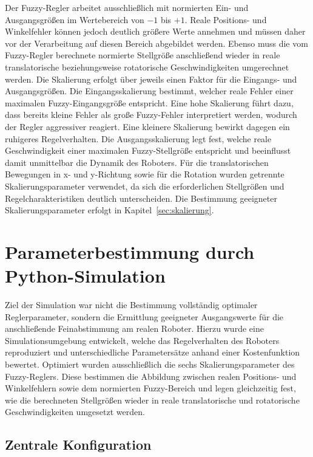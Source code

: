Der Fuzzy-Regler arbeitet ausschließlich mit normierten Ein- und Ausgangsgrößen im Wertebereich von $-1$ bis $+1$. Reale Positions- und Winkelfehler können jedoch deutlich größere Werte annehmen und müssen daher vor der Verarbeitung auf diesen Bereich abgebildet werden. Ebenso muss die vom Fuzzy-Regler berechnete normierte Stellgröße anschließend wieder in reale translatorische beziehungsweise rotatorische Geschwindigkeiten umgerechnet werden. Die Skalierung erfolgt über jeweils einen Faktor für die Eingangs- und Ausgangsgrößen. Die Eingangsskalierung bestimmt, welcher reale Fehler einer maximalen Fuzzy-Eingangsgröße entspricht. Eine hohe Skalierung führt dazu, dass bereits kleine Fehler als große Fuzzy-Fehler interpretiert werden, wodurch der Regler aggressiver reagiert. Eine kleinere Skalierung bewirkt dagegen ein ruhigeres Regelverhalten. Die Ausgangsskalierung legt fest, welche reale Geschwindigkeit einer maximalen Fuzzy-Stellgröße entspricht und beeinflusst damit unmittelbar die Dynamik des Roboters. Für die translatorischen Bewegungen in x- und y-Richtung sowie für die Rotation wurden getrennte Skalierungsparameter verwendet, da sich die erforderlichen Stellgrößen und Regelcharakteristiken deutlich unterscheiden. Die Bestimmung geeigneter Skalierungsparameter erfolgt in Kapitel~\ref{sec:skalierung}.

\section{Parameterbestimmung durch Python-Simulation}

Ziel der Simulation war nicht die Bestimmung vollständig optimaler Reglerparameter, sondern die Ermittlung geeigneter Ausgangswerte für die anschließende Feinabstimmung am realen Roboter. Hierzu wurde eine Simulationsumgebung entwickelt, welche das Regelverhalten des Roboters reproduziert und unterschiedliche Parametersätze anhand einer Kostenfunktion bewertet. Optimiert wurden ausschließlich die sechs Skalierungsparameter des Fuzzy-Reglers. Diese bestimmen die Abbildung zwischen realen Positions- und Winkelfehlern sowie dem normierten Fuzzy-Bereich und legen gleichzeitig fest, wie die berechneten Stellgrößen wieder in reale translatorische und rotatorische Geschwindigkeiten umgesetzt werden.

\subsection{Zentrale Konfiguration}

